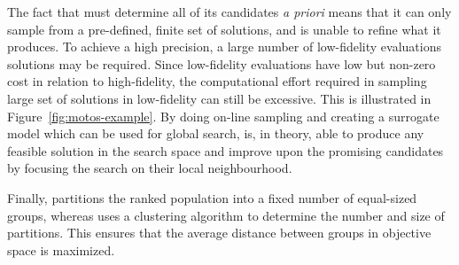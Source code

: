 The fact that \motos{} must determine all of its candidates \emph{a priori} means that it can only sample from a pre-defined, finite set of solutions, and is unable to refine what it produces. To achieve a high precision, a large number of low-fidelity evaluations solutions may be required. Since low-fidelity evaluations have low but non-zero cost in relation to high-fidelity, the computational effort required in sampling large set of solutions in low-fidelity can still be excessive. This is illustrated in Figure~\ref{fig:motos-example}. By doing on-line sampling and creating a surrogate model which can be used for global search, \AlgName{} is, in theory, able to produce any feasible solution in the search space and improve upon the promising candidates by focusing the search on their local neighbourhood.

Finally, \motos{} partitions the ranked population into a fixed number of equal-sized groups, whereas \AlgName{} uses a clustering algorithm to determine the number and size of partitions. This ensures that the average distance between groups in objective space is maximized. %

